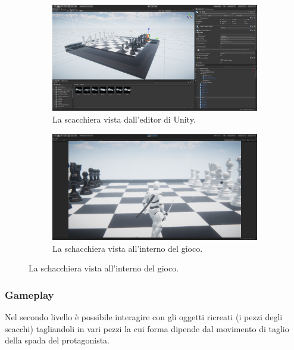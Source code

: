 \documentclass[12pt]{report}
\begin{document}
\begin{figure}[H]
  \centering
  \begin{subfigure}[b]{0.45\linewidth}
    \centering
    \includegraphics[width=\linewidth]{img/chess-scene.png}
    \captionsetup{justification=centering}
    \caption{La scacchiera vista dall'editor di Unity.} 
  \end{subfigure}
   \begin{subfigure}[b]{0.45\linewidth}
    \centering
    \includegraphics[width=\linewidth]{img/chess-in-game.png}
    \captionsetup{justification=centering}
    \caption{La schacchiera vista all'interno del gioco.}
  \end{subfigure}
\end{figure}

\subsubsection*{Gameplay}
Nel secondo livello è possibile interagire con gli oggetti ricreati (i pezzi degli scacchi) tagliandoli in vari pezzi la cui forma dipende dal movimento di taglio della spada del protagonista.
\end{document}
